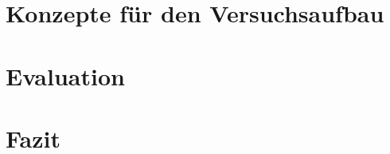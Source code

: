 \chapter{Konzepte f\"{u}r den Versuchsaufbau}\label{ch:concepts}










\chapter{Evaluation}\label{ch:evaluation}




\chapter{Fazit}\label{ch:conclusion}



